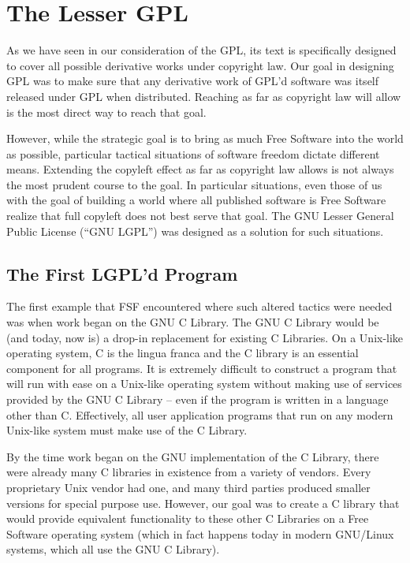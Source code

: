 \documentclass[12pt]{report}
\begin{document}
\chapter{The Lesser GPL}

As we have seen in our consideration of the GPL, its text is specifically
designed to cover all possible derivative works under copyright law.  Our
goal in designing GPL was to make sure that any derivative work of GPL'd
software was itself released under GPL when distributed.  Reaching as far
as copyright law will allow is the most direct way to reach that goal.

However, while the strategic goal is to bring as much Free Software into
the world as possible, particular tactical situations of software freedom
dictate different means.  Extending the copyleft effect as far as
copyright law allows is not always the most prudent course to the goal.
In particular situations, even those of us with the goal of building a
world where all published software is Free Software realize that full
copyleft does not best serve that goal.  The GNU Lesser General Public
License (``GNU LGPL'') was designed as a solution for such situations.

\section{The First LGPL'd Program}

The first example that FSF encountered where such altered tactics were
needed was when work began on the GNU C Library.  The GNU C Library would
be (and today, now is) a drop-in replacement for existing C Libraries.  On
a Unix-like operating system, C is the lingua franca and the C library is
an essential component for all programs.  It is extremely difficult to
construct a program that will run with ease on a Unix-like operating
system without making use of services provided by the GNU C Library --
even if the program is written in a language other than C\@.  Effectively,
all user application programs that run on any modern Unix-like system must
make use of the C Library.

By the time work began on the GNU implementation of the C Library, there
were already many C libraries in existence from a variety of vendors.
Every proprietary Unix vendor had one, and many third parties produced
smaller versions for special purpose use.  However, our goal was to create
a C library that would provide equivalent functionality to these other C
Libraries on a Free Software operating system (which in fact happens today
in modern GNU/Linux systems, which all use the GNU C Library).
\end{document}
